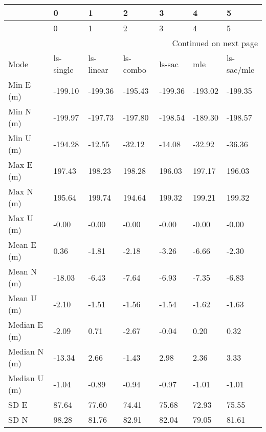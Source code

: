 \begin{longtable}{lllllll}
\toprule
{} &          0 &          1 &         2 &        3 &        4 &           5 \\
\midrule
\endfirsthead

\toprule
{} &          0 &          1 &         2 &        3 &        4 &           5 \\
\midrule
\endhead
\midrule
\multicolumn{7}{r}{{Continued on next page}} \\
\midrule
\endfoot

\bottomrule
\endlastfoot
Mode              &  ls-single &  ls-linear &  ls-combo &   ls-sac &      mle &  ls-sac/mle \\
Min E (m)         &    -199.10 &    -199.36 &   -195.43 &  -199.36 &  -193.02 &     -199.35 \\
Min N (m)         &    -199.97 &    -197.73 &   -197.80 &  -198.54 &  -189.30 &     -198.57 \\
Min U (m)         &    -194.28 &     -12.55 &    -32.12 &   -14.08 &   -32.92 &      -36.36 \\
Max E (m)         &     197.43 &     198.23 &    198.28 &   196.03 &   197.17 &      196.03 \\
Max N (m)         &     195.64 &     199.74 &    194.64 &   199.32 &   199.21 &      199.32 \\
Max U (m)         &      -0.00 &      -0.00 &     -0.00 &    -0.00 &    -0.00 &       -0.00 \\
Mean E (m)        &       0.36 &      -1.81 &     -2.18 &    -3.26 &    -6.66 &       -2.30 \\
Mean N (m)        &     -18.03 &      -6.43 &     -7.64 &    -6.93 &    -7.35 &       -6.83 \\
Mean U (m)        &      -2.10 &      -1.51 &     -1.56 &    -1.54 &    -1.62 &       -1.63 \\
Median E (m)      &      -2.09 &       0.71 &     -2.67 &    -0.04 &     0.20 &        0.32 \\
Median N (m)      &     -13.34 &       2.66 &     -1.43 &     2.98 &     2.36 &        3.33 \\
Median U (m)      &      -1.04 &      -0.89 &     -0.94 &    -0.97 &    -1.01 &       -1.01 \\
SD E              &      87.64 &      77.60 &     74.41 &    75.68 &    72.93 &       75.55 \\
SD N              &      98.28 &      81.76 &     82.91 &    82.04 &    79.05 &       81.61 \\

\end{longtable}
